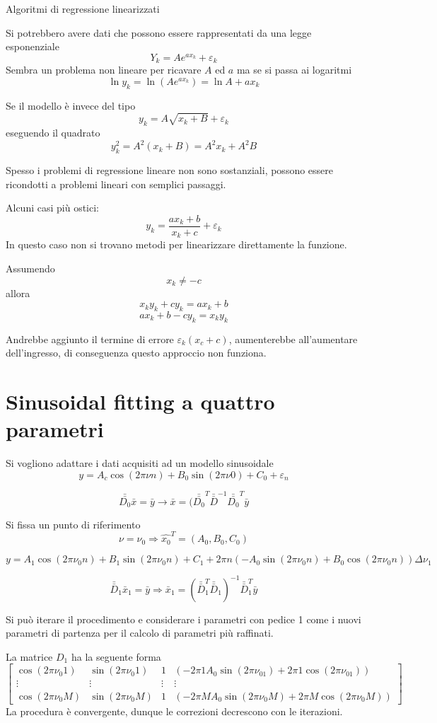 
Algoritmi di regressione linearizzati

Si potrebbero avere dati che possono essere rappresentati da una legge
esponenziale
$$
Y_k = Ae^{ax_k} + \varepsilon_k
$$
Sembra un problema non lineare per ricavare $A$ ed $a$ ma se si passa ai
logaritmi
$$
\ln y_k = \ln(Ae^{ax_k}) = \ln A + ax_k
$$

Se il modello è invece del tipo
$$y_k = A\sqrt{x_k + B} + \varepsilon_k
$$
eseguendo il quadrato
$$
y_k^2 = A^2(x_k + B) = A^2x_k + A^2B
$$

Spesso i problemi di regressione lineare non sono sostanziali, possono
essere ricondotti a problemi lineari con semplici passaggi.

Alcuni casi più ostici:
$$
y_k = \frac{ax_k + b}{x_k + c} + \varepsilon_k
$$
In questo caso non si trovano metodi per linearizzare direttamente la funzione.

Assumendo
$$
x_k \neq -c
$$
allora $$
x_ky_k + cy_k = ax_k + b
$$
$$
ax_k + b - cy_k = x_ky_k
$$

Andrebbe aggiunto il termine di errore $\varepsilon_k(x_c + c) $, aumenterebbe
all'aumentare dell'ingresso, di conseguenza questo approccio non funziona.


\section{Sinusoidal fitting a quattro parametri}
Si vogliono adattare i dati acquisiti ad un modello sinusoidale
$$
y = A_c\cos(2\pi\nu n) + B_0\sin(2\pi\nu 0) + C_0 + \varepsilon_n
$$

$$
\bar{\bar{D_0}}\bar{x} = \bar{y} \rightarrow \bar{x} = (\bar{\bar{D_0}}^T
\bar{\bar{D}}^{-1}\bar{\bar{D_0}}^T \bar{y}
$$

Si fissa un punto di riferimento
$$
\nu = \nu_0 \Rightarrow \hat{x_0}^T = (A_0,B_0,C_0)
$$

$$
y = A_1\cos(2\pi\nu_0 n) + B_1\sin(2\pi\nu_0 n) + C_1 + 2\pi
n(-A_0\sin(2\pi\nu_0 n) + B_0\cos(2\pi\nu_0 n))\Delta\nu_1
$$

$$
\bar{\bar{D}}_1 \bar{x}_1 = \bar{y} \Rightarrow \bar{x}_1 =
(\bar{\bar{D}}_1^T\bar{\bar{D}}_1)^{-1} \bar{\bar{D}}_1^T \bar{y}
$$

Si può iterare il procedimento e considerare i parametri con pedice 1 come i
nuovi parametri di partenza per il calcolo di parametri più raffinati.

La matrice $D_1$ ha la seguente forma
$$
\begin{bmatrix}
\cos(2\pi\nu_0 1) & \sin(2\pi\nu_0 1) & 1 & (-2\pi1 A_0
\sin(2\pi\nu_01)+2\pi1\cos(2\pi\nu_01))\\
\vdots & \vdots & \vdots & \vdots \\
\cos(2\pi\nu_0 M) & \sin(2\pi\nu_0 M ) & 1 & (-2\pi M A_0
\sin(2\pi\nu_0 M)+2\pi M\cos(2\pi\nu_0 M))
\end{bmatrix}
$$
La procedura è convergente, dunque le correzioni decrescono con le iterazioni.

